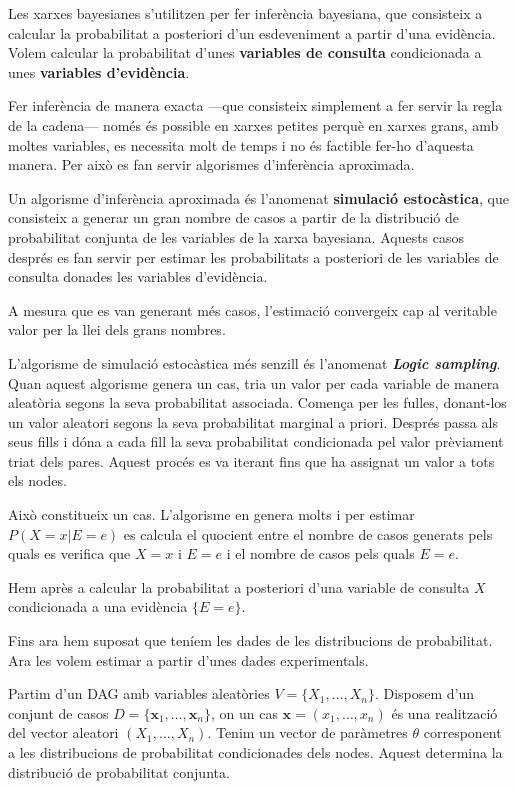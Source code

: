 \documentclass{article}
\theoremstyle{definition}
\begin{document}
Les xarxes bayesianes s'utilitzen per fer infer\`{e}ncia bayesiana, que consisteix a calcular la probabilitat a posteriori d'un esdeveniment a partir d'una evid\`{e}ncia. Volem calcular la probabilitat d'unes \textbf{variables de consulta} condicionada a unes \textbf{variables d'evid\`{e}ncia}.

Fer infer\`{e}ncia de manera exacta ---que consisteix simplement a fer servir la regla de la cadena--- nom\'{e}s \'{e}s possible en xarxes petites perqu\`{e} en xarxes grans, amb moltes variables, es necessita molt de temps i no \'{e}s factible fer-ho d'aquesta manera. Per aix\`{o} es fan servir algorismes d'infer\`{e}ncia aproximada.

Un algorisme d'infer\`{e}ncia aproximada \'{e}s l'anomenat \textbf{simulaci\'{o} estoc\`{a}stica}, que consisteix a generar un gran nombre de casos a partir de la distribuci\'{o} de probabilitat conjunta de les variables de la xarxa bayesiana. Aquests casos despr\'{e}s es fan servir per estimar les probabilitats a posteriori de les variables de consulta donades les variables d'evid\`{e}ncia.

A mesura que es van generant m\'{e}s casos, l'estimaci\'{o} convergeix cap al veritable valor per la llei dels grans nombres.

L'algorisme de simulaci\'{o} estoc\`{a}stica m\'{e}s senzill \'{e}s l'anomenat \textbf{\emph{Logic sampling}}. Quan aquest algorisme genera un cas, tria un valor per cada variable de manera aleat\`{o}ria segons la seva probabilitat associada. Comen\c{c}a per les fulles, donant-los un valor aleatori segons la seva probabilitat marginal a priori. Despr\'{e}s passa als seus fills i d\'{o}na a cada fill la seva probabilitat condicionada pel valor pr\`{e}viament triat dels pares. Aquest proc\'{e}s es va iterant fins que ha assignat un valor a tots els nodes.

Aix\`{o} constitueix un cas. L'algorisme en genera molts i per estimar $P(X=x|E=e)$ es calcula el quocient entre el nombre de casos generats pels quals es verifica que $X=x$ i $E=e$ i el nombre de casos pels quals $E=e$.

Hem apr\`{e}s a calcular la probabilitat a posteriori d'una variable de consulta $X$ condicionada a una evid\`{e}ncia $\{E=e\}$.

Fins ara hem suposat que ten\'{i}em les dades de les distribucions de probabilitat. Ara les volem estimar a partir d'unes dades experimentals.

Partim d'un DAG amb variables aleat\`{o}ries $V=\{X_1,\ldots,X_n\}$. Disposem d'un conjunt de casos $D=\{\boldsymbol{x}_1,\ldots,\boldsymbol{x}_n\}$, on un cas $\boldsymbol{x}=(x_1,\ldots,x_n)$ \'{e}s una realitzaci\'{o} del vector aleatori $(X_1,\ldots,X_n)$. Tenim un vector de par\`{a}metres $\theta$ corresponent a les distribucions de probabilitat condicionades dels nodes. Aquest determina la distribuci\'{o} de probabilitat conjunta.
\end{document}
